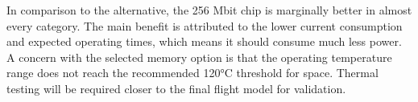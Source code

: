 In comparison to the alternative, the 256 Mbit chip is marginally better in almost every category. The main benefit is attributed to the lower current consumption and expected operating times, which means it should consume much less power. A concern with the selected memory option is that the operating temperature range does not reach the recommended 120°C threshold for space. Thermal testing will be required closer to the final flight model for validation.